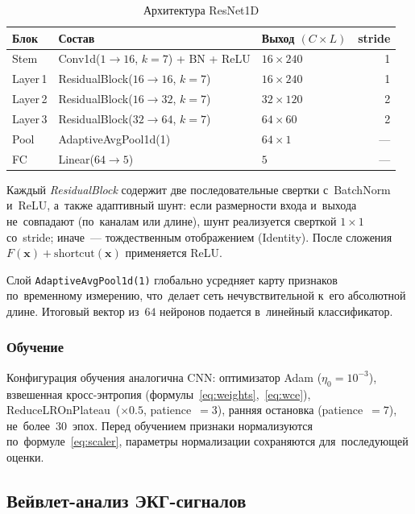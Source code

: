 \begin{table}[h]
\centering
\caption{Архитектура ResNet1D}
\label{tab:resnet_arch}
\begin{tabular}{lllr}
\hline
\textbf{Блок} & \textbf{Состав} & \textbf{Выход $(C \times L)$} &
\textbf{stride} \\
\hline
Stem     & Conv1d($1\to16$, $k=7$) + BN + ReLU & $16\times240$ & 1 \\
\hline
Layer\,1 & ResidualBlock($16\to16$, $k=7$)     & $16\times240$ & 1 \\
Layer\,2 & ResidualBlock($16\to32$, $k=7$)     & $32\times120$ & 2 \\
Layer\,3 & ResidualBlock($32\to64$, $k=7$)     & $64\times60$  & 2 \\
\hline
Pool     & AdaptiveAvgPool1d(1)                 & $64\times1$   & --- \\
FC       & Linear($64\to5$)                    & $5$           & --- \\
\hline
\end{tabular}
\end{table}

Каждый \textit{ResidualBlock} содержит две последовательные
свертки с~BatchNorm и~ReLU, а~также адаптивный шунт:
если размерности входа и~выхода не~совпадают (по~каналам или
длине), шунт реализуется сверткой $1\times1$ со~stride; иначе~---
тождественным отображением (Identity).
После сложения $F(\mathbf{x}) + \text{shortcut}(\mathbf{x})$
применяется ReLU.

Слой \texttt{AdaptiveAvgPool1d(1)} глобально усредняет
карту признаков по~временному измерению, что~делает сеть
нечувствительной к~его абсолютной длине.
Итоговый вектор из~$64$ нейронов подается в~линейный
классификатор.

\subsubsection{Обучение}

Конфигурация обучения аналогична CNN: оптимизатор Adam
($\eta_0 = 10^{-3}$), взвешенная кросс-энтропия
(формулы~\eqref{eq:weights},~\eqref{eq:wce}),
ReduceLROnPlateau~($\times0.5$, patience~$=3$),
ранняя остановка (patience~$=7$), не~более~$30$~эпох.
Перед обучением признаки нормализуются по~формуле~\eqref{eq:scaler},
параметры нормализации сохраняются для~последующей оценки.

\subsection{Вейвлет-анализ ЭКГ-сигналов}


